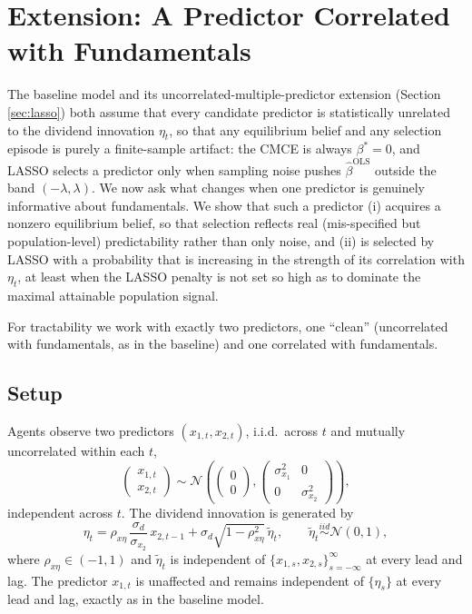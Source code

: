 \section{Extension: A Predictor Correlated with Fundamentals}\label{sec:correlated_extension}

The baseline model and its uncorrelated-multiple-predictor extension (Section \ref{sec:lasso}) both assume that every candidate predictor is statistically unrelated to the dividend innovation $\eta_t$, so that any equilibrium belief and any selection episode is purely a finite-sample artifact: the CMCE is always $\beta^*=0$, and LASSO selects a predictor only when sampling noise pushes $\hat\beta^{\text{OLS}}$ outside the band $(-\lambda,\lambda)$. We now ask what changes when one predictor is genuinely informative about fundamentals. We show that such a predictor (i) acquires a nonzero equilibrium belief, so that selection reflects real (mis-specified but population-level) predictability rather than only noise, and (ii) is selected by LASSO with a probability that is increasing in the strength of its correlation with $\eta_t$, at least when the LASSO penalty is not set so high as to dominate the maximal attainable population signal.

For tractability we work with exactly two predictors, one ``clean'' (uncorrelated with fundamentals, as in the baseline) and one correlated with fundamentals.

\subsection{Setup}

\begin{assumption}\label{ass:corr_predictor}
Agents observe two predictors $(x_{1,t},x_{2,t})$, i.i.d.\ across $t$ and mutually uncorrelated within each $t$,
\begin{equation}\label{eq:bivariate_predictors}
\begin{pmatrix}x_{1,t}\\x_{2,t}\end{pmatrix} \sim \mathcal N\left(\begin{pmatrix}0\\0\end{pmatrix},\begin{pmatrix}\sigma_{x_1}^2 & 0\\ 0 & \sigma_{x_2}^2\end{pmatrix}\right),
\end{equation}
independent across $t$. The dividend innovation is generated by
\begin{equation}\label{eq:eta_corr}
\eta_t = \rho_{x\eta}\,\frac{\sigma_d}{\sigma_{x_2}}\,x_{2,t-1} + \sigma_d\sqrt{1-\rho_{x\eta}^2}\,\tilde\eta_t, \qquad \tilde\eta_t\stackrel{iid}{\sim}\mathcal N(0,1),
\end{equation}
where $\rho_{x\eta}\in(-1,1)$ and $\tilde\eta_t$ is independent of $\{x_{1,s},x_{2,s}\}_{s=-\infty}^{\infty}$ at every lead and lag. The predictor $x_{1,t}$ is unaffected and remains independent of $\{\eta_s\}$ at every lead and lag, exactly as in the baseline model.
\end{assumption}

